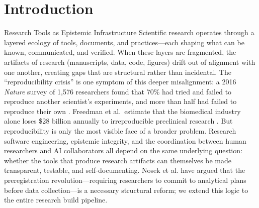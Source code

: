 \documentclass[
  ignorenonframetext,
]{beamer}
\author{\texorpdfstring{}{}}
\date{}
\begin{document}
\section{Introduction}\label{introduction}

\begin{frame}[allowframebreaks]{Research Tools as Epistemic
Infrastructure}
\protect{}\label{research-tools-as-epistemic-infrastructure}
Scientific research operates through a layered ecology of tools,
documents, and practices---each shaping what can be known, communicated,
and verified. When these layers are fragmented, the artifacts of
research (manuscripts, data, code, figures) drift out of alignment with
one another, creating gaps that are structural rather than incidental.
The ``reproducibility crisis'' is one symptom of this deeper
misalignment: a 2016 \emph{Nature} survey of 1,576 researchers found
that 70\% had tried and failed to reproduce another scientist's
experiments, and more than half had failed to reproduce their own
. Freedman et al.~estimate that the
biomedical industry alone loses \$28 billion annually to irreproducible
preclinical research . But reproducibility
is only the most visible face of a broader problem. Research software
engineering, epistemic integrity, and the coordination between human
researchers and AI collaborators all depend on the same underlying
question: whether the tools that produce research artifacts can
themselves be made transparent, testable, and self-documenting. Nosek et
al.  have argued that the preregistration
revolution---requiring researchers to commit to analytical plans before
data collection---is a necessary structural reform; we extend this logic
to the entire research build pipeline.


\end{frame}
\end{document}
